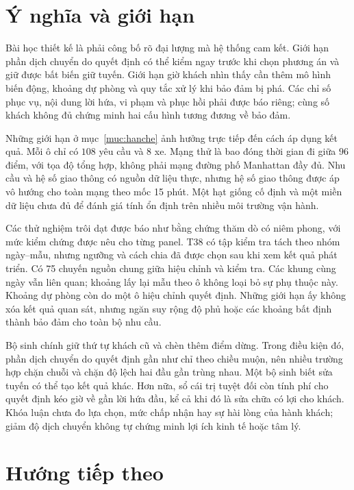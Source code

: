 \section{Ý nghĩa và giới hạn}

Bài học thiết kế là phải công bố rõ đại lượng mà hệ thống cam kết. Giới hạn phần dịch
chuyển do quyết định có thể kiểm ngay trước khi chọn phương án và giữ được bất biến
giữ tuyến. Giới hạn giờ khách nhìn thấy cần thêm mô hình biến động, khoảng dự phòng và
quy tắc xử lý khi bảo đảm bị phá. Các chỉ số phục vụ, nội dung lời hứa, vi phạm và phục
hồi phải được báo riêng; cùng số khách không đủ chứng minh hai cấu hình tương đương
về bảo đảm.

Những giới hạn ở mục~\ref{muc:hanche} ảnh hưởng trực tiếp đến cách áp dụng kết quả.
Mỗi ô chỉ có $108$ yêu cầu và $8$ xe. Mạng thử là bao đóng thời gian đi giữa $96$
điểm, với tọa độ tổng hợp, không phải mạng đường phố Manhattan đầy đủ. Nhu cầu và hệ số
giao thông có nguồn dữ liệu thực, nhưng hệ số giao thông được áp vô hướng cho toàn mạng
theo mốc 15 phút. Một hạt giống cố định và một miền dữ liệu chưa đủ để đánh giá tính
ổn định trên nhiều môi trường vận hành.

Các thử nghiệm trôi dạt được báo như bằng chứng thăm dò có niêm phong, với mức kiểm
chứng được nêu cho từng panel. T38 có tập kiểm tra tách theo nhóm ngày--mẫu, nhưng
ngưỡng và cách chia đã được chọn sau khi xem kết quả phát triển. Có 75 chuyến nguồn
chung giữa hiệu chỉnh và kiểm tra. Các khung cùng ngày vẫn liên quan; khoảng lấy lại
mẫu theo ô không loại bỏ sự phụ thuộc này. Khoảng dự phòng còn do một ô hiệu chỉnh
quyết định. Những giới
hạn ấy không xóa kết quả quan sát, nhưng ngăn suy rộng độ phủ hoặc các khoảng bất
định thành bảo đảm cho toàn bộ nhu cầu.

Bộ sinh chính giữ thứ tự khách cũ và chèn thêm điểm dừng. Trong điều kiện đó, phần
dịch chuyển do quyết định gần như chỉ theo chiều muộn, nên nhiều trường hợp chặn
chuỗi và chặn độ lệch hai đầu gần trùng nhau. Một bộ sinh biết sửa tuyến có thể tạo
kết quả khác. Hơn nữa, sổ cái trị tuyệt đối còn tính phí cho quyết định kéo giờ về
gần lời hứa đầu, kể cả khi đó là sửa chữa có lợi cho khách. Khóa luận chưa đo lựa
chọn, mức chấp nhận hay sự hài lòng của hành khách; giảm độ dịch chuyển không tự
chứng minh lợi ích kinh tế hoặc tâm lý.

\section{Hướng tiếp theo}

